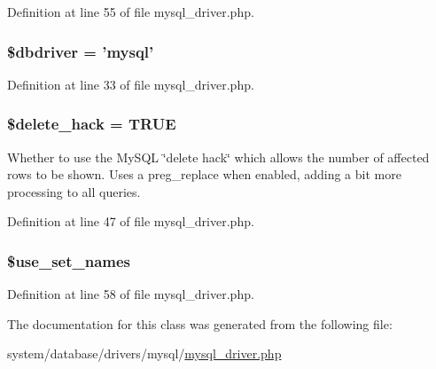 Definition at line 55 of file mysql\-\_\-driver.\-php.

\hypertarget{class_c_i___d_b__mysql__driver_a0cde2a16322a023d040aa7f725877597}{
\subsubsection[{\$dbdriver}]{\setlength{\rightskip}{0pt plus 5cm}\$dbdriver = 'mysql'}}\label{class_c_i___d_b__mysql__driver_a0cde2a16322a023d040aa7f725877597}


Definition at line 33 of file mysql\-\_\-driver.\-php.

\hypertarget{class_c_i___d_b__mysql__driver_ad60008f32a478e978c7c3284f320f273}{
\subsubsection[{\$delete\-\_\-hack}]{\setlength{\rightskip}{0pt plus 5cm}\$delete\-\_\-hack = T\-R\-U\-E}}\label{class_c_i___d_b__mysql__driver_ad60008f32a478e978c7c3284f320f273}
Whether to use the My\-S\-Q\-L \char`\"{}delete hack\char`\"{} which allows the number of affected rows to be shown. Uses a preg\-\_\-replace when enabled, adding a bit more processing to all queries. 

Definition at line 47 of file mysql\-\_\-driver.\-php.

\hypertarget{class_c_i___d_b__mysql__driver_ac291b90d602cce25b980208dbc52be99}{
\subsubsection[{\$use\-\_\-set\-\_\-names}]{\setlength{\rightskip}{0pt plus 5cm}\$use\-\_\-set\-\_\-names}}\label{class_c_i___d_b__mysql__driver_ac291b90d602cce25b980208dbc52be99}


Definition at line 58 of file mysql\-\_\-driver.\-php.



The documentation for this class was generated from the following file\-:\begin{DoxyCompactItemize}
\item 
system/database/drivers/mysql/\hyperlink{mysql__driver_8php}{mysql\-\_\-driver.\-php}\end{DoxyCompactItemize}
